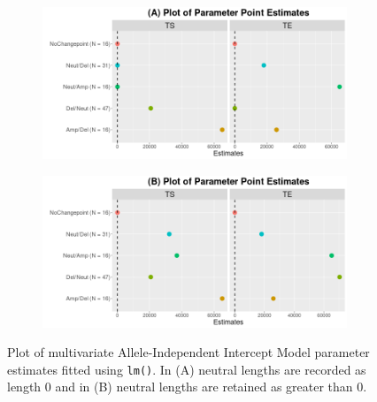 \begin{figure}[H]
\vspace{1cm}
     \begin{subfigure}[t]{.49\textwidth}
      \centering
      \includegraphics[width = 1\textwidth]{../figures/Chapter_5/Multivariate_lm_7_AI_Interval.png}
    \end{subfigure}%
     \begin{subfigure}[t]{.49\textwidth}
      \centering
       \includegraphics[width = 1\textwidth]{../figures/Chapter_5/Multivariate_lm_7_Neut_AI_Interval.png}
    \end{subfigure} 
     \caption[Plot of multivariate Allele-Independent Intercept Model parameter estimates fitted using \texttt{lm()}.]{Plot of multivariate Allele-Independent Intercept Model parameter estimates fitted using \texttt{lm()}. In (A) neutral lengths are recorded as length 0 and in (B) neutral lengths are retained as greater than 0.}
     \label{fig:lm_multi_1_int}
\end{figure}

